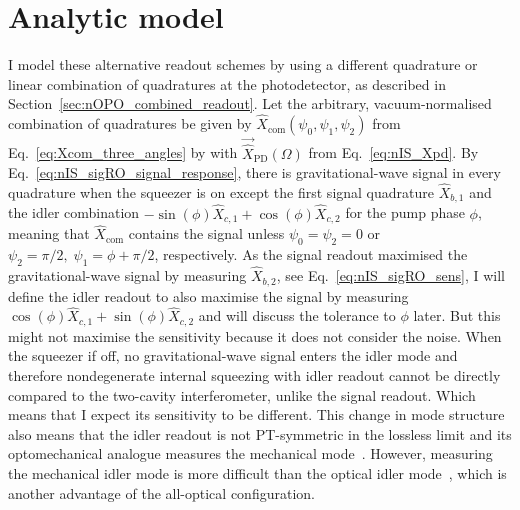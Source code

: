 \section{Analytic model}

I model these alternative readout schemes by using a different quadrature or linear combination of quadratures at the photodetector, as described in Section~\ref{sec:nOPO_combined_readout}. Let the arbitrary, vacuum-normalised combination of quadratures be given by $\hat{X}_\text{com}(\psi_0,\psi_1,\psi_2)$ from Eq.~\ref{eq:Xcom_three_angles} by with $\vec{\hat X}_\text{PD}(\Omega)$ from Eq.~\ref{eq:nIS_Xpd}. By Eq.~\ref{eq:nIS_sigRO_signal_response}, there is gravitational-wave signal in every quadrature when the squeezer is on except the first signal quadrature $\hat{X}_{b,1}$ and the idler combination $-\sin(\phi)\hat{X}_{c,1}+\cos(\phi)\hat{X}_{c,2}$ for the pump phase $\phi$, meaning that $\hat{X}_\text{com}$ contains the signal unless $\psi_0=\psi_2=0$ or $\psi_2=\pi/2,\;\psi_1=\phi+\pi/2$, respectively. As the signal readout maximised the gravitational-wave signal by measuring $\hat{X}_{b,2}$, see Eq.~\ref{eq:nIS_sigRO_sens}, I will define the idler readout to also maximise the signal by measuring $\cos(\phi)\hat{X}_{c,1}+\sin(\phi)\hat{X}_{c,2}$ and will discuss the tolerance to $\phi$ later. But this might not maximise the sensitivity because it does not consider the noise.
When the squeezer if off, no gravitational-wave signal enters the idler mode and therefore nondegenerate internal squeezing with idler readout cannot be directly compared to the two-cavity interferometer, unlike the signal readout. Which means that I expect its sensitivity to be different.
This change in mode structure also means that the idler readout is not PT-symmetric in the lossless limit  and its optomechanical analogue measures the mechanical mode~\cite{Li2021}. However, measuring the mechanical idler mode is more difficult than the optical idler mode~\cite{}, which is another advantage of the all-optical configuration.
